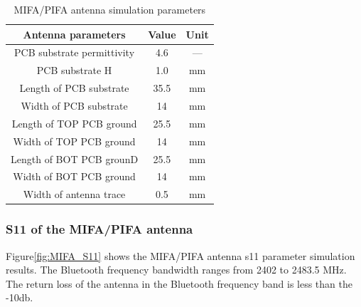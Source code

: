 \begin{table}[h]
	\centering
	\begin{tabular}{|c|c|c| }
		\hline 
		\textbf{Antenna parameters} & \textbf{Value} & \textbf{Unit} \\ 
		\hline
		PCB substrate permittivity & 4.6 & — \\
		\hline
		PCB substrate H & 1.0 & mm \\
		\hline
		Length of PCB substrate & 35.5 &mm\\
		\hline
		Width of PCB substrate &14 &mm\\
		\hline
		Length of TOP PCB ground & 25.5& mm\\
		\hline
		Width of TOP PCB ground& 14& mm\\
		\hline
		Length of BOT PCB grounD &25.5 &mm\\
		\hline
		Width of BOT PCB ground &14 &mm\\
		\hline
		Width of antenna trace &0.5 &mm\\
		\hline
	\end{tabular}
	\caption{MIFA/PIFA antenna simulation parameters \cite{NXP_AN11994_Antenna_Guide}}
	\label{tb:MIFA_ANTENNA_SIMULATION_PARAMETERS}
\end{table}

\subsubsection{S11 of the MIFA/PIFA antenna}
Figure\ref{fig:MIFA_S11} shows the MIFA/PIFA antenna s11 parameter simulation results. The Bluetooth frequency bandwidth ranges from 2402 to 2483.5 MHz. The return loss of the antenna in the Bluetooth frequency band is less than the -10db.


